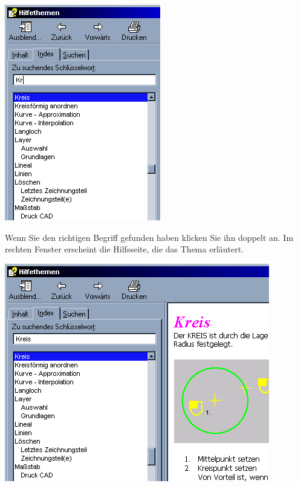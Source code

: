 \documentclass[14pt,a4paper]{book}
\begin{document}
\includegraphics{pic/Suche2.png}

Wenn Sie den richtigen Begriff gefunden haben klicken Sie ihn doppelt an. Im rechten Fenster 
erscheint die Hilfsseite, die das Thema erläutert.

\includegraphics{pic/Suche3.png}
\end{document}
